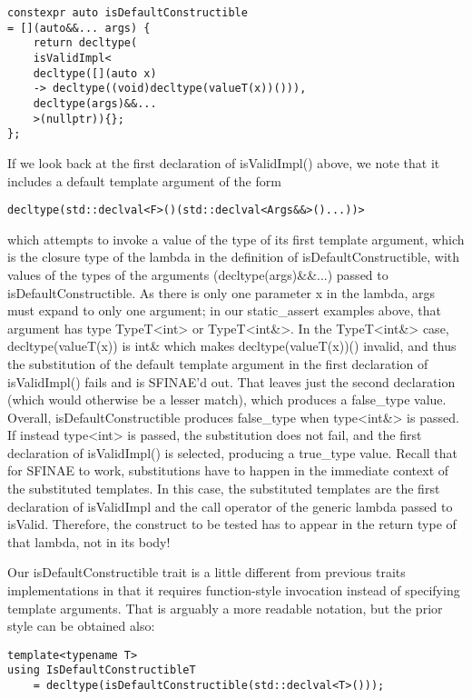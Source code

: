 \begin{lstlisting}[style=styleCXX]
constexpr auto isDefaultConstructible
= [](auto&&... args) {
	return decltype(
	isValidImpl<
	decltype([](auto x)
	-> decltype((void)decltype(valueT(x))())),
	decltype(args)&&...
	>(nullptr)){};
};
\end{lstlisting}

If we look back at the first declaration of isValidImpl() above, we note that it includes a default template argument of the form

\begin{lstlisting}[style=styleCXX]
decltype(std::declval<F>()(std::declval<Args&&>()...))>
\end{lstlisting}

which attempts to invoke a value of the type of its first template argument, which is the closure type of the lambda in the definition of isDefaultConstructible, with values of the types of the arguments (decltype(args)\&\&...) passed to isDefaultConstructible. As there is only one parameter x in the lambda, args must expand to only one argument; in our static\_assert examples above, that argument has type TypeT<int> or TypeT<int\&>. In the TypeT<int\&> case, decltype(valueT(x)) is int\& which makes decltype(valueT(x))() invalid, and thus the substitution of the default template argument in the first declaration of isValidImpl() fails and is SFINAE’d out. That leaves just the second declaration (which would otherwise be a lesser match), which produces a false\_type value. Overall, isDefaultConstructible produces false\_type when type<int\&> is passed. If instead type<int> is passed, the substitution does not fail, and the first declaration of isValidImpl() is selected, producing a true\_type value. Recall that for SFINAE to work, substitutions have to happen in the immediate context of the substituted templates. In this case, the substituted templates are the first declaration of isValidImpl and the call operator of the generic lambda passed to isValid. Therefore, the construct to be tested has to appear in the return type of that lambda, not in its body!

Our isDefaultConstructible trait is a little different from previous traits implementations in that it requires function-style invocation instead of specifying template arguments. That is arguably a more readable notation, but the prior style can be obtained also:

\begin{lstlisting}[style=styleCXX]
template<typename T>
using IsDefaultConstructibleT
	= decltype(isDefaultConstructible(std::declval<T>()));
\end{lstlisting}

